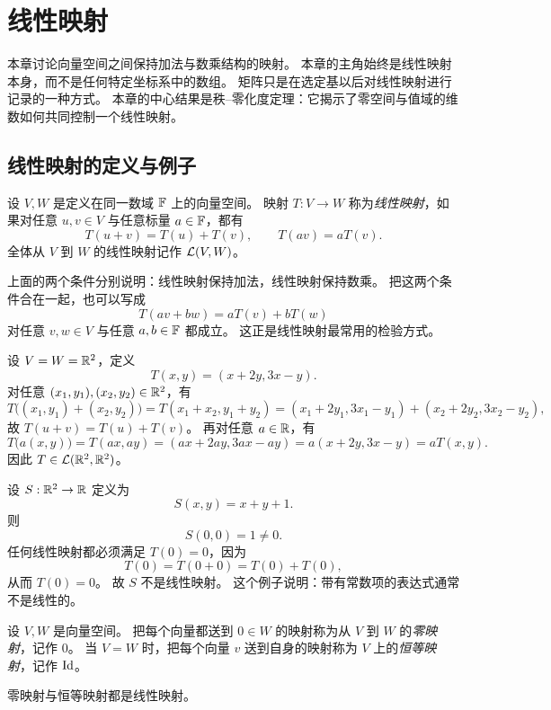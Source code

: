 \chapter{线性映射}

本章讨论向量空间之间保持加法与数乘结构的映射。 本章的主角始终是线性映射本身，而不是任何特定坐标系中的数组。 矩阵只是在选定基以后对线性映射进行记录的一种方式。
本章的中心结果是秩--零化度定理：它揭示了零空间与值域的维数如何共同控制一个线性映射。

\section{线性映射的定义与例子}

\begin{definition} 设 $V,W$ 是定义在同一数域 $\mathbb{F}$ 上的向量空间。 映射 $T:V\to W$ 称为\emph{线性映射}，如果对任意
$u,v\in V$ 与任意标量 $a\in\mathbb{F}$，都有 \[ T(u+v)=T(u)+T(v),\qquad T(av)=aT(v). \] 全体从 $V$ 到 $W$
的线性映射记作 $\mathcal{L}(V,W)$。 \end{definition}

上面的两个条件分别说明：线性映射保持加法，线性映射保持数乘。 把这两个条件合在一起，也可以写成 \[ T(av+bw)=aT(v)+bT(w) \] 对任意 $v,w\in
V$ 与任意 $a,b\in\mathbb{F}$ 都成立。 这正是线性映射最常用的检验方式。

\begin{example} 设 $V=W=\mathbb{R}^2$，定义 \[ T(x,y)=(x+2y,3x-y). \] 对任意
$(x_1,y_1),(x_2,y_2)\in\mathbb{R}^2$，有 \[ T\bigl((x_1,y_1)+(x_2,y_2)\bigr) =T(x_1+x_2,y_1+y_2)
=(x_1+2y_1,3x_1-y_1)+(x_2+2y_2,3x_2-y_2), \] 故 $T(u+v)=T(u)+T(v)$。 再对任意 $a\in\mathbb{R}$，有 \[
T\bigl(a(x,y)\bigr)=T(ax,ay)=(ax+2ay,3ax-ay)=a(x+2y,3x-y)=aT(x,y). \] 因此
$T\in\mathcal{L}(\mathbb{R}^2,\mathbb{R}^2)$。 \end{example}

\begin{example} 设 $S:\mathbb{R}^2\to\mathbb{R}$ 定义为 \[ S(x,y)=x+y+1. \] 则 \[ S(0,0)=1\neq 0. \]
任何线性映射都必须满足 $T(0)=0$，因为 \[ T(0)=T(0+0)=T(0)+T(0), \] 从而 $T(0)=0$。 故 $S$ 不是线性映射。
这个例子说明：带有常数项的表达式通常不是线性的。 \end{example}

\begin{definition} 设 $V,W$ 是向量空间。 把每个向量都送到 $0\in W$ 的映射称为从 $V$ 到 $W$ 的\emph{零映射}，记作 $0$。
当 $V=W$ 时，把每个向量 $v$ 送到自身的映射称为 $V$ 上的\emph{恒等映射}，记作 $\mathrm{Id}$。 \end{definition}

\begin{proposition} 零映射与恒等映射都是线性映射。 \end{proposition}

